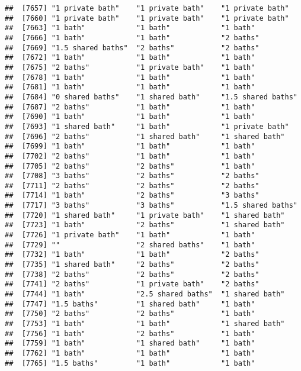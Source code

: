 \documentclass[
]{article}
\begin{document}
\begin{verbatim}
##  [7657] "1 private bath"    "1 private bath"    "1 private bath"   
##  [7660] "1 private bath"    "1 private bath"    "1 private bath"   
##  [7663] "1 bath"            "1 bath"            "1 bath"           
##  [7666] "1 bath"            "1 bath"            "2 baths"          
##  [7669] "1.5 shared baths"  "2 baths"           "2 baths"          
##  [7672] "1 bath"            "1 bath"            "1 bath"           
##  [7675] "2 baths"           "1 private bath"    "1 bath"           
##  [7678] "1 bath"            "1 bath"            "1 bath"           
##  [7681] "1 bath"            "1 bath"            "1 bath"           
##  [7684] "0 shared baths"    "1 shared bath"     "1.5 shared baths" 
##  [7687] "2 baths"           "1 bath"            "1 bath"           
##  [7690] "1 bath"            "1 bath"            "1 bath"           
##  [7693] "1 shared bath"     "1 bath"            "1 private bath"   
##  [7696] "2 baths"           "1 shared bath"     "1 shared bath"    
##  [7699] "1 bath"            "1 bath"            "1 bath"           
##  [7702] "2 baths"           "1 bath"            "1 bath"           
##  [7705] "2 baths"           "2 baths"           "1 bath"           
##  [7708] "3 baths"           "2 baths"           "2 baths"          
##  [7711] "2 baths"           "2 baths"           "2 baths"          
##  [7714] "1 bath"            "2 baths"           "3 baths"          
##  [7717] "3 baths"           "3 baths"           "1.5 shared baths" 
##  [7720] "1 shared bath"     "1 private bath"    "1 shared bath"    
##  [7723] "1 bath"            "2 baths"           "1 shared bath"    
##  [7726] "1 private bath"    "1 bath"            "1 bath"           
##  [7729] ""                  "2 shared baths"    "1 bath"           
##  [7732] "1 bath"            "1 bath"            "2 baths"          
##  [7735] "1 shared bath"     "2 baths"           "2 baths"          
##  [7738] "2 baths"           "2 baths"           "2 baths"          
##  [7741] "2 baths"           "1 private bath"    "2 baths"          
##  [7744] "1 bath"            "2.5 shared baths"  "1 shared bath"    
##  [7747] "1.5 baths"         "1 shared bath"     "1 bath"           
##  [7750] "2 baths"           "2 baths"           "1 bath"           
##  [7753] "1 bath"            "1 bath"            "1 shared bath"    
##  [7756] "1 bath"            "2 baths"           "1 bath"           
##  [7759] "1 bath"            "1 shared bath"     "1 bath"           
##  [7762] "1 bath"            "1 bath"            "1 bath"           
##  [7765] "1.5 baths"         "1 bath"            "1 bath"           

\end{verbatim}
\end{document}
